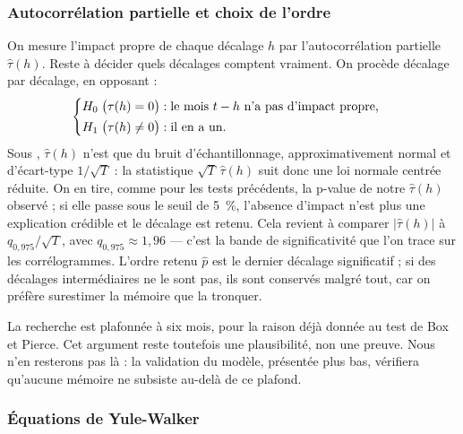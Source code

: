 \subsubsection*{Autocorrélation partielle et choix de l'ordre}

On mesure l'impact propre de chaque décalage \(h\) par l'autocorrélation
partielle \(\hat\tau(h)\). Reste à décider quels décalages comptent vraiment.
On procède décalage par décalage, en opposant :
\[
  \begin{cases}
    H_0 \;\bigl(\tau(h) = 0\bigr) : \text{le mois } t-h \text{ n'a pas d'impact propre,}\\[2pt]
    H_1 \;\bigl(\tau(h) \neq 0\bigr) : \text{il en a un.}
  \end{cases}
\]
Sous \Hzero{}, \(\hat\tau(h)\) n'est que du bruit d'échantillonnage,
approximativement normal et d'écart-type \(1/\sqrt{T}\) : la statistique
\(\sqrt{T}\,\hat\tau(h)\) suit donc une loi normale centrée réduite. On en
tire, comme pour les tests précédents, la p-value de notre \(\hat\tau(h)\)
observé ; si elle passe sous le seuil de 5~\%, l'absence d'impact n'est plus
une explication crédible et le décalage est retenu. Cela revient à comparer
\(\bigl|\hat\tau(h)\bigr|\) à \(q_{0{,}975}/\sqrt{T}\), avec
\(q_{0{,}975} \approx 1{,}96\) — c'est la bande de significativité que l'on
trace sur les corrélogrammes.
L'ordre retenu \(\hat p\) est le dernier décalage significatif ; si
des décalages intermédiaires ne le sont pas, ils sont conservés
malgré tout, car on préfère surestimer la mémoire que la tronquer.

La recherche est plafonnée à six mois, pour la raison déjà donnée au test de
Box et Pierce. Cet argument reste toutefois une plausibilité, non une preuve.
Nous n'en resterons pas là : la validation du modèle, présentée plus bas,
vérifiera qu'aucune mémoire ne subsiste au-delà de ce plafond.

\subsubsection*{Équations de Yule-Walker}

